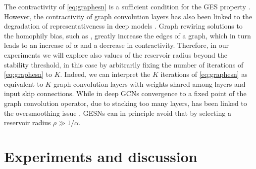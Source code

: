 \documentclass{esannV2p}
\begin{document}
The contractivity of \eqref{eq:graphesn} is a sufficient condition for the GES property \cite{Tortorella2022}.
However, the contractivity of graph convolution layers has also been linked to the degradation of representativeness in deep models \cite{Topping2022}.
Graph rewiring solutions to the homophily bias, such as \cite{Gasteiger2019}, greatly increase the edges of a graph, which in turn leads to an increase of $\alpha$ and a decrease in contractivity.
Therefore, in our experiments we will explore also values of the reservoir radius beyond the stability threshold, in this case by arbitrarily fixing the number of iterations of \eqref{eq:graphesn} to $K$.
Indeed, we can interpret the $K$ iterations of \eqref{eq:graphesn} as equivalent to $K$ graph convolution layers with weights shared among layers and input skip connections.
While in deep GCNs convergence to a fixed point of the graph convolution operator, due to stacking too many layers, has been linked to the oversmoothing issue \cite{Li2018}, GESNs can in principle avoid that by selecting a reservoir radius $\rho \gg 1/\alpha$.

\section{Experiments and discussion}\label{sec:experiments}
\end{document}
